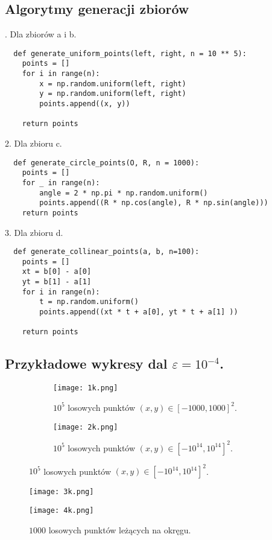 \subsection{Algorytmy generacji zbiorów}
. Dla zbiorów a i b.
 \begin{lstlisting}
  def generate_uniform_points(left, right, n = 10 ** 5):
    points = []
    for i in range(n):
        x = np.random.uniform(left, right)
        y = np.random.uniform(left, right)
        points.append((x, y))

    return points
\end{lstlisting}
\par
2. Dla zbioru c.
\begin{lstlisting}
  def generate_circle_points(O, R, n = 1000):
    points = []
    for _ in range(n):
        angle = 2 * np.pi * np.random.uniform()
        points.append((R * np.cos(angle), R * np.sin(angle)))
    return points
\end{lstlisting}
\par
3. Dla zbioru d.
\begin{lstlisting}
  def generate_collinear_points(a, b, n=100):
    points = []
    xt = b[0] - a[0]
    yt = b[1] - a[1]
    for i in range(n):
        t = np.random.uniform()
        points.append((xt * t + a[0], yt * t + a[1] ))
    
    return points
\end{lstlisting}
\subsection{Przykładowe wykresy dal $\varepsilon = 10^{-4}$.}
\begin{figure}[h]
    \centering
    \begin{subfigure}{.5\textwidth}
      \centering
      \texttt{[image: 1k.png]}
      \caption{$10^5$ losowych punktów $(x, y) \in \left[-1000,1000\right]^{2}$.}
      \label{fig:sub1}
    \end{subfigure}%
    \begin{subfigure}{.5\textwidth}
      \centering
      \texttt{[image: 2k.png]}
      \caption{$10^5$ losowych punktów $(x, y) \in \left[-10^{14},10^{14}\right]^{2}$.}
      \label{fig:sub2}
    \end{subfigure}
    \label{fig:test}
    \end{figure}
    
    \begin{figure}[h]
    \centering
    \begin{minipage}{.5\textwidth}
      \centering
      \texttt{[image: 3k.png]}
      \caption{$1000$ losowych punktów leżących na okręgu.}
      \label{fig:test1}
    \end{minipage}%
    \begin{minipage}{.5\textwidth}
      \centering
      \texttt{[image: 4k.png]}
      \label{fig:test2}
    \end{minipage}
    \end{figure}
